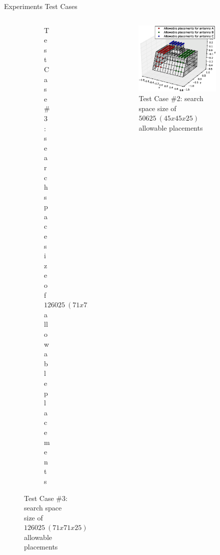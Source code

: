 \documentclass{beamer}
\begin{document}
\begin{frame}{Experiments Test Cases}
\begin{columns}
\begin{column}{.5\columnwidth}
\begin{figure}
\begin{subfigure}{\columnwidth}
                    \caption*{\tiny Test Case \#3: search space size of $126025~(71x71x25)$ allowable placements}%
                \end{subfigure}\hfill%
            \end{figure}
        \end{column}
        \begin{column}{.5\columnwidth}
            \begin{figure}
                \vspace{-0.5cm}
                \begin{subfigure}{\columnwidth}
                    \includegraphics[trim=0 30 0 50, clip, scale=0.25]{../paper/FIG/tc2_figure}%
                    \caption*{\tiny Test Case \#2: search space size of $50625~(45x45x25)$ allowable placements}%
                \end{subfigure}\hfill\\%
                \begin{subfigure}{\columnwidth}

\end{subfigure}
\end{figure}
\end{column}
\end{columns}
\end{frame}
\end{document}
